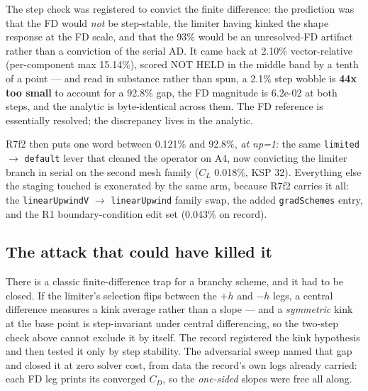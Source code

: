 \documentclass[11pt,a4paper]{article}
\begin{document}
The step check was registered to convict the finite difference: the prediction was that the
FD would \emph{not} be step-stable, the limiter having kinked the shape response at the FD
scale, and that the 93\% would be an unresolved-FD artifact rather than a conviction of the
serial AD. It came back at 2.10\% vector-relative (per-component max 15.14\%), scored NOT HELD
in the middle band by a tenth of a point --- and read in substance rather than spun, a 2.1\%
step wobble is \textbf{44x too small} to account for a 92.8\% gap, the FD magnitude is
6.2e-02 at both steps, and the analytic is byte-identical across them. The FD reference is
essentially resolved; the discrepancy lives in the analytic.

R7f2 then puts one word between 0.121\% and 92.8\%, \emph{at np=1}: the same
\texttt{limited} \(\rightarrow\) \texttt{default} lever that cleaned the operator on A4, now
convicting the limiter branch in serial on the second mesh family (\(C_L\) 0.018\%, KSP 32).
Everything else the staging touched is exonerated by the same arm, because R7f2 carries it
all: the \texttt{linearUpwindV} \(\rightarrow\) \texttt{linearUpwind} family swap, the added
\texttt{gradSchemes} entry, and the R1 boundary-condition edit set (0.043\% on record).

\subsection{The attack that could have killed it}

There is a classic finite-difference trap for a branchy scheme, and it had to be closed. If
the limiter's selection flips between the \(+h\) and \(-h\) legs, a central difference
measures a kink average rather than a slope --- and a \emph{symmetric} kink at the base point
is step-invariant under central differencing, so the two-step check above cannot exclude it by
itself. The record registered the kink hypothesis and then tested it only by step stability.
The adversarial sweep named that gap and closed it at zero solver cost, from data the
record's own logs already carried: each FD leg prints its converged \(C_D\), so the
\emph{one-sided} slopes were free all along.
\end{document}
